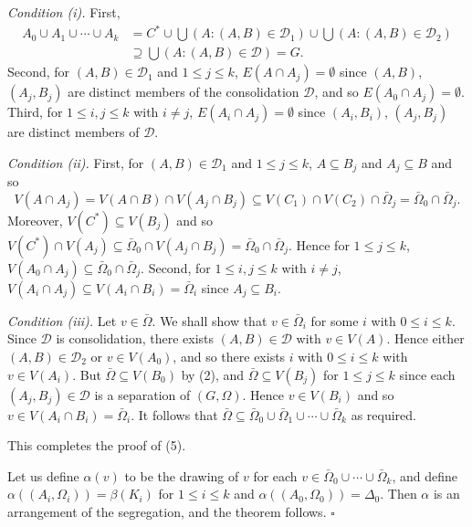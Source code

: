 \textit{Condition (i).} First,
\begin{align*}
A_0 \cup A_1 \cup \cdots \cup A_k &= C^* \cup \bigcup (A : (A, B) \in \mathcal{D}_1) \cup \bigcup (A : (A, B) \in \mathcal{D}_2) \\
&\supseteq \bigcup (A : (A, B) \in \mathcal{D}) = G.
\end{align*}
Second, for $(A, B) \in \mathcal{D}_1$ and $1 \le j \le k$, $E(A \cap A_j) = \emptyset$ since $(A, B)$, $(A_j, B_j)$ are distinct members of the consolidation $\mathcal{D}$, and so $E(A_0 \cap A_j) = \emptyset$. Third, for $1 \le i, j \le k$ with $i \ne j$, $E(A_i \cap A_j) = \emptyset$ since $(A_i, B_i)$, $(A_j, B_j)$ are distinct members of $\mathcal{D}$.

\textit{Condition (ii).} First, for $(A, B) \in \mathcal{D}_1$ and $1 \le j \le k$, $A \subseteq B_j$ and $A_j \subseteq B$ and so
\begin{equation*}
V(A \cap A_j) = V(A \cap B) \cap V(A_j \cap B_j) \subseteq V(C_1) \cap V(C_2) \cap \bar{\Omega}_j = \bar{\Omega}_0 \cap \bar{\Omega}_j.
\end{equation*}
Moreover, $V(C^*) \subseteq V(B_j)$ and so $V(C^*) \cap V(A_j) \subseteq \bar{\Omega}_0 \cap V(A_j \cap B_j) = \bar{\Omega}_0 \cap \bar{\Omega}_j$. Hence for $1 \le j \le k$, $V(A_0 \cap A_j) \subseteq \bar{\Omega}_0 \cap \bar{\Omega}_j$. Second, for $1 \le i, j \le k$ with $i \ne j$, $V(A_i \cap A_j) \subseteq V(A_i \cap B_i) = \bar{\Omega}_i$ since $A_j \subseteq B_i$.

\textit{Condition (iii).} Let $v \in \bar{\Omega}$. We shall show that $v \in \bar{\Omega}_i$ for some $i$ with $0 \le i \le k$. Since $\mathcal{D}$ is consolidation, there exists $(A, B) \in \mathcal{D}$ with $v \in V(A)$. Hence either $(A, B) \in \mathcal{D}_2$ or $v \in V(A_0)$, and so there exists $i$ with $0 \le i \le k$ with $v \in V(A_i)$. But $\bar{\Omega} \subseteq V(B_0)$ by (2), and $\bar{\Omega} \subseteq V(B_j)$ for $1 \le j \le k$ since each $(A_j, B_j) \in \mathcal{D}$ is a separation of $(G, \Omega)$. Hence $v \in V(B_i)$ and so $v \in V(A_i \cap B_i) = \bar{\Omega}_i$. It follows that $\bar{\Omega} \subseteq \bar{\Omega}_0 \cup \bar{\Omega}_1 \cup \cdots \cup \bar{\Omega}_k$ as required.

This completes the proof of (5).

Let us define $\alpha(v)$ to be the drawing of $v$ for each $v \in \bar{\Omega}_0 \cup \cdots \cup \bar{\Omega}_k$, and define $\alpha((A_i, \Omega_i)) = \beta(K_i)$ for $1 \le i \le k$ and $\alpha((A_0, \Omega_0)) = \Delta_0$. Then $\alpha$ is an arrangement of the segregation, and the theorem follows. $\square$

